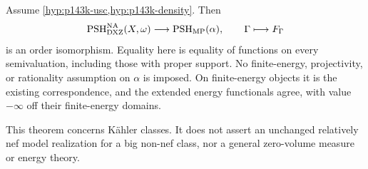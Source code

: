 \begin{theorem}\label{thm:p143k-full-comparison}
Assume \cref{hyp:p143k-usc,hyp:p143k-density}. Then
\[
 \operatorname{PSH}^{\mathrm{NA}}_{\mathrm{DXZ}}(X,\omega)
 \longrightarrow\operatorname{PSH}_{\mathrm{MP}}(\alpha),\qquad
 \Gamma\longmapsto F_\Gamma
\]
is an order isomorphism. Equality here is equality of functions on every
semivaluation, including those with proper support. No finite-energy,
projectivity, or rationality assumption on \(\alpha\) is imposed.
On finite-energy objects it is the existing correspondence, and the
extended energy functionals agree, with value \(-\infty\) off their
finite-energy domains.
\end{theorem}

This theorem concerns K\"ahler classes. It does not assert an unchanged
relatively nef model realization for a big non-nef class, nor a general
zero-volume measure or energy theory.
